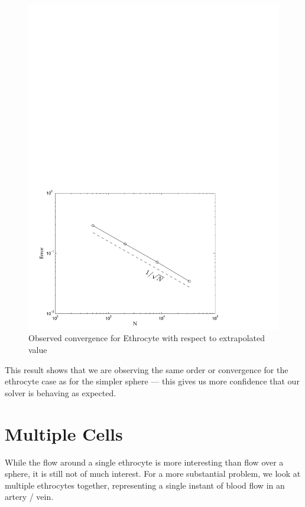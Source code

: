 \begin{figure}
\begin{center}
	\includegraphics[width=12.5cm]{img/ExtrapolatedConverged.pdf}
	\caption{Observed convergence for Ethrocyte with respect to extrapolated value}
	\label{fig:rbc_extrapolated_convergence}
\end{center}
\end{figure}

This result shows that we are observing the same order or convergence for the ethrocyte case as for the simpler sphere --- this gives us more confidence that our {\fmmbem} solver is behaving as expected.

\section{Multiple Cells}\label{sec:multiple_cells}

While the flow around a single ethrocyte is more interesting than flow over a sphere, it is still not of much interest. For a more substantial problem, we look at multiple ethrocytes together, representing a single instant of blood flow in an artery / vein.

